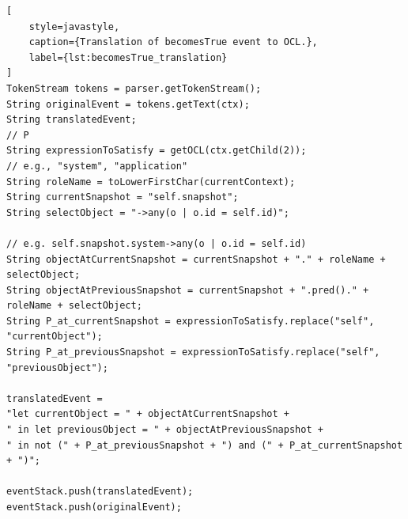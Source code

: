 \begin{lstlisting}[
    style=javastyle,
    caption={Translation of becomesTrue event to OCL.},
    label={lst:becomesTrue_translation}
]
TokenStream tokens = parser.getTokenStream();
String originalEvent = tokens.getText(ctx);
String translatedEvent;
// P
String expressionToSatisfy = getOCL(ctx.getChild(2)); 
// e.g., "system", "application"
String roleName = toLowerFirstChar(currentContext); 
String currentSnapshot = "self.snapshot"; 
String selectObject = "->any(o | o.id = self.id)";

// e.g. self.snapshot.system->any(o | o.id = self.id)
String objectAtCurrentSnapshot = currentSnapshot + "." + roleName + selectObject;
String objectAtPreviousSnapshot = currentSnapshot + ".pred()." + roleName + selectObject;
String P_at_currentSnapshot = expressionToSatisfy.replace("self", "currentObject");
String P_at_previousSnapshot = expressionToSatisfy.replace("self", "previousObject");

translatedEvent = 
"let currentObject = " + objectAtCurrentSnapshot +
" in let previousObject = " + objectAtPreviousSnapshot +
" in not (" + P_at_previousSnapshot + ") and (" + P_at_currentSnapshot + ")";

eventStack.push(translatedEvent);
eventStack.push(originalEvent);    
\end{lstlisting}

